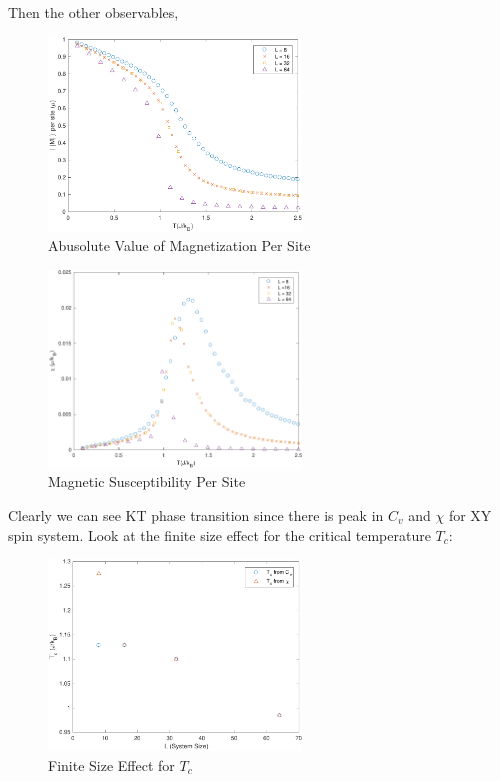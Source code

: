 \documentclass[a4paper]{article}
\begin{document}
Then the other observables,

\begin{figure}[H]
\centering
\includegraphics[width = 0.6\textwidth]{../Flux-Data/M_T-crop.pdf}
\caption{Abusolute Value of Magnetization Per Site}
\end{figure}

\begin{figure}[H]
\centering
\includegraphics[width = 0.6\textwidth]{../Flux-Data/X_T-crop.pdf}
\caption{Magnetic Susceptibility Per Site}
\end{figure}

Clearly we can see KT phase transition since there is peak in $C_v$ and $\chi$ for XY spin system. Look at the finite size effect for the critical temperature $T_c$:

\begin{figure}[H]
\centering
\includegraphics[width = 0.6\textwidth]{../Flux-Data/Tc_L-crop.pdf}
\caption{Finite Size Effect for $T_c$}
\end{figure}
\end{document}
